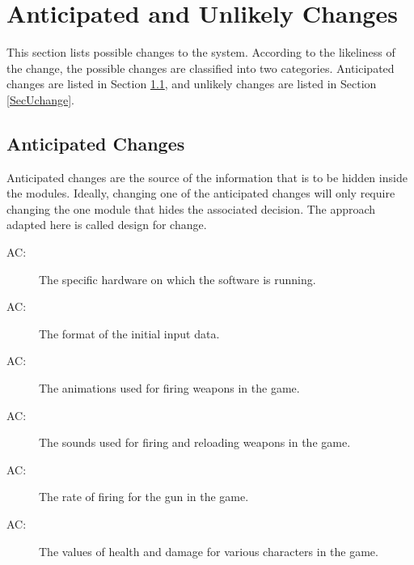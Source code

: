 \documentclass[12pt, titlepage]{article}
\newcounter{acnum}
\newcommand{\actheacnum}{AC\theacnum}
\begin{document}


\section{Anticipated and Unlikely Changes} \label{SecChange}

This section lists possible changes to the system. According to the likeliness
of the change, the possible changes are classified into two
categories. Anticipated changes are listed in Section \ref{SecAchange}, and
unlikely changes are listed in Section \ref{SecUchange}.

\subsection{Anticipated Changes} \label{SecAchange}

Anticipated changes are the source of the information that is to be hidden
inside the modules. Ideally, changing one of the anticipated changes will only
require changing the one module that hides the associated decision. The approach
adapted here is called design for
change.

\begin{description}
\item[ \actheacnum \label{acHardware}:] The specific
  hardware on which the software is running.
\item[ \actheacnum \label{acInput}:] The format of the
  initial input data.
\item[ \actheacnum \label{acAnimations}:] The animations used for firing weapons in the game.
\item[ \actheacnum \label{acSounds}:] The sounds used for firing and reloading weapons in the game.
\item[ \actheacnum \label{acFireRate}:] The rate of firing for the gun in the game.
\item[ \actheacnum \label{acHealth}:] The values of health and damage for various characters in the game.
\end{description}
\end{document}
